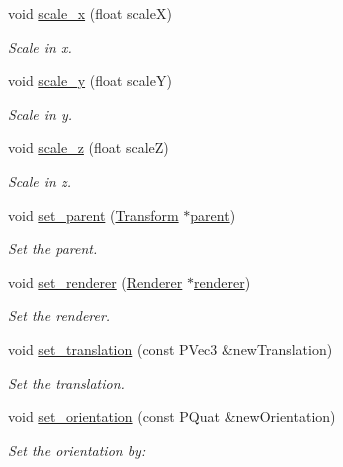 \begin{DoxyCompactItemize}
void \mbox{\hyperlink{classprz_1_1_transform_a3954a22c651edb9d7ebd3fc02e819464}{scale\+\_\+x}} (float scaleX)
\begin{DoxyCompactList}\small\item\em Scale in x. \end{DoxyCompactList}\item 
void \mbox{\hyperlink{classprz_1_1_transform_a84fe3a084d8a95376502752bf23611d9}{scale\+\_\+y}} (float scaleY)
\begin{DoxyCompactList}\small\item\em Scale in y. \end{DoxyCompactList}\item 
void \mbox{\hyperlink{classprz_1_1_transform_a89e8432dcde698da7dbf125e5260363e}{scale\+\_\+z}} (float scaleZ)
\begin{DoxyCompactList}\small\item\em Scale in z. \end{DoxyCompactList}\item 
void \mbox{\hyperlink{classprz_1_1_transform_a064010404c7ea3de8bf7588f54349de4}{set\+\_\+parent}} (\mbox{\hyperlink{classprz_1_1_transform}{Transform}} $\ast$\mbox{\hyperlink{classprz_1_1_transform_a9acc3ca9bcab25fba6ab51727c240432}{parent}})
\begin{DoxyCompactList}\small\item\em Set the parent. \end{DoxyCompactList}\item 
void \mbox{\hyperlink{classprz_1_1_transform_a67be0fd111f99b7022637309be974dce}{set\+\_\+renderer}} (\mbox{\hyperlink{classprz_1_1_renderer}{Renderer}} $\ast$\mbox{\hyperlink{classprz_1_1_transform_ad54f15b6454bb7b1df3fa529e41032db}{renderer}})
\begin{DoxyCompactList}\small\item\em Set the renderer. \end{DoxyCompactList}\item 
void \mbox{\hyperlink{classprz_1_1_transform_a918637af3605f6cff9ad6ac6f7094158}{set\+\_\+translation}} (const P\+Vec3 \&new\+Translation)
\begin{DoxyCompactList}\small\item\em Set the translation. \end{DoxyCompactList}\item 
void \mbox{\hyperlink{classprz_1_1_transform_a742cfd3728bfda05c88eca51a1c4d094}{set\+\_\+orientation}} (const P\+Quat \&new\+Orientation)
\begin{DoxyCompactList}\small\item\em Set the orientation by\+: \end{DoxyCompactList}\item 

\end{DoxyCompactItemize}
